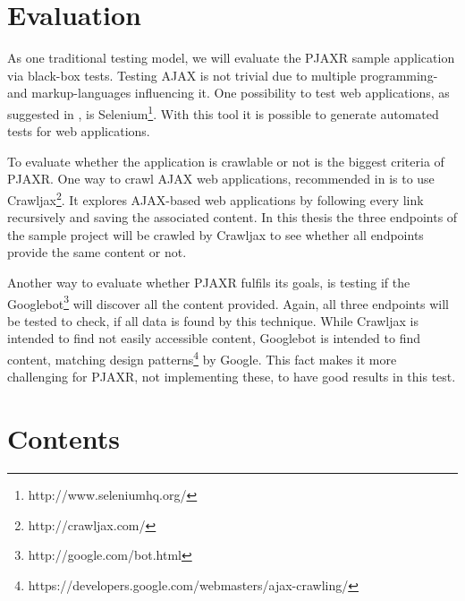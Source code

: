 \documentclass[f,bachelor,binding,twoside,palatino]{WeSTthesis}
\def \ajax {AJAX}
\def \pjaxr {PJAXR}
\begin{document}
\section{Evaluation}
  As one traditional testing model, we will evaluate the \pjaxr{} sample application via black-box tests.
  Testing \ajax{} is not trivial due to multiple programming- and markup-languages influencing it. 
  One possibility to test web applications, as suggested in \cite{lundmark11}, is Selenium\footnote{http://www.seleniumhq.org/}.
  With this tool it is possible to generate automated tests for web applications.
  
  To evaluate whether the application is crawlable or not is the biggest criteria of \pjaxr{}.
  One way to crawl \ajax{} web applications, recommended in \cite{crawljax:tweb12} is to use Crawljax\footnote{http://crawljax.com/}. 
  It explores \ajax{}-based web applications by following every link recursively and saving the associated content. In this thesis the three endpoints of the sample project will be crawled by Crawljax to see whether all endpoints provide the same content or not.
  
  Another way to evaluate whether \pjaxr{} fulfils its goals, is testing if the Googlebot\footnote{http://google.com/bot.html} will discover all the content provided.
  Again, all three endpoints will be tested to check, if all data is found by this technique.
  While Crawljax is intended to find not easily accessible content, Googlebot is intended to find content, matching design patterns\footnote{https://developers.google.com/webmasters/ajax-crawling/} by Google. This fact makes it more challenging for \pjaxr{}, not implementing these, to have good results in this test.

\section{Contents}
\end{document}
